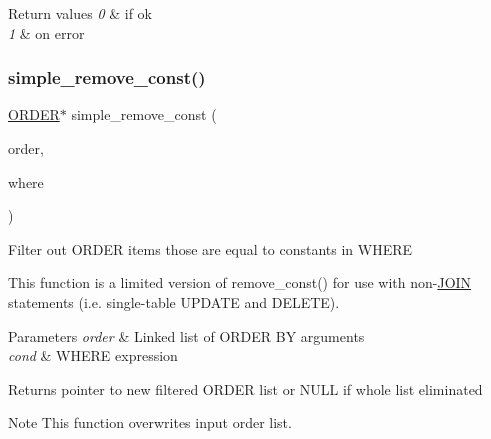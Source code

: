 \begin{DoxyRetVals}{Return values}
{\em 0} & if ok \\
\hline
{\em 1} & on error \\
\hline
\end{DoxyRetVals}
\mbox{\label{group__Query__Optimizer_gadbc980a72c17c8442fab87af085697d4}} 
\subsubsection{\texorpdfstring{simple\+\_\+remove\+\_\+const()}{simple\_remove\_const()}}
{\footnotesize\ttfamily \mbox{\hyperlink{structst__order}{O\+R\+D\+ER}}$\ast$ simple\+\_\+remove\+\_\+const (\begin{DoxyParamCaption}\item[{\mbox{\hyperlink{structst__order}{O\+R\+D\+ER}} $\ast$}]{order,  }\item[{\mbox{\hyperlink{classItem}{Item}} $\ast$}]{where }\end{DoxyParamCaption})}

Filter out O\+R\+D\+ER items those are equal to constants in W\+H\+E\+RE

This function is a limited version of remove\+\_\+const() for use with non-\/\mbox{\hyperlink{classJOIN}{J\+O\+IN}} statements (i.\+e. single-\/table U\+P\+D\+A\+TE and D\+E\+L\+E\+TE).


\begin{DoxyParams}{Parameters}
{\em order} & Linked list of O\+R\+D\+ER BY arguments \\
\hline
{\em cond} & W\+H\+E\+RE expression\\
\hline
\end{DoxyParams}
\begin{DoxyReturn}{Returns}
pointer to new filtered O\+R\+D\+ER list or N\+U\+LL if whole list eliminated
\end{DoxyReturn}
\begin{DoxyNote}{Note}
This function overwrites input order list. 
\end{DoxyNote}
\mbox{\label{group__Query__Optimizer_gac2c4cb376fec34447cf5df2b3d4c238a}} 
